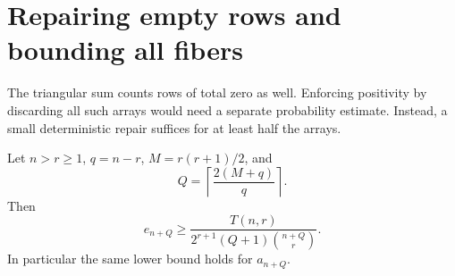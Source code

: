 \section{Repairing empty rows and bounding all fibers}\label{sec:repair}
The triangular sum counts rows of total zero as well. Enforcing positivity by discarding all such arrays would need a separate probability estimate. Instead, a small deterministic repair suffices for at least half the arrays.

\begin{proposition}\label{prop:repair}
Let $n>r\ge1$, $q=n-r$, $M=r(r+1)/2$, and
\begin{equation}\label{eq:Q}
 Q=\left\lceil\frac{2(M+q)}q\right\rceil.
\end{equation}
Then
\begin{equation}\label{eq:finitelower}
 e_{n+Q}\ge
 \frac{T(n,r)}{2^{r+1}(Q+1)\binom{n+Q}{r}}.
\end{equation}
In particular the same lower bound holds for $a_{n+Q}$.
\end{proposition}
